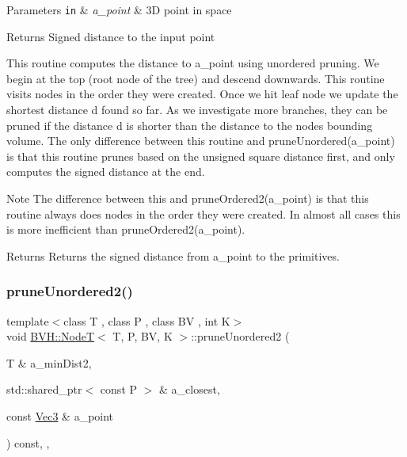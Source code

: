 \begin{DoxyParams}[1]{Parameters}
\mbox{\tt in}  & {\em a\+\_\+point} & 3D point in space \\
\hline
\end{DoxyParams}
\begin{DoxyReturn}{Returns}
Signed distance to the input point
\end{DoxyReturn}
This routine computes the distance to a\+\_\+point using unordered pruning. We begin at the top (root node of the tree) and descend downwards. This routine visits nodes in the order they were created. Once we hit leaf node we update the shortest distance \textquotesingle{}d\textquotesingle{} found so far. As we investigate more branches, they can be pruned if the distance \textquotesingle{}d\textquotesingle{} is shorter than the distance to the node\textquotesingle{}s bounding volume. The only difference between this routine and prune\+Unordered(a\+\_\+point) is that this routine prunes based on the unsigned square distance first, and only computes the signed distance at the end. \begin{DoxyNote}{Note}
The difference between this and prune\+Ordered2(a\+\_\+point) is that this routine always does nodes in the order they were created. In almost all cases this is more inefficient than prune\+Ordered2(a\+\_\+point). 
\end{DoxyNote}
\begin{DoxyReturn}{Returns}
Returns the signed distance from a\+\_\+point to the primitives. 
\end{DoxyReturn}
\mbox{\label{classBVH_1_1NodeT_a1079cba9ac1f114ad2cbc6cdea2eae49}} 
\subsubsection{\texorpdfstring{prune\+Unordered2()}{pruneUnordered2()}\hspace{0.1cm}{\footnotesize\ttfamily [2/2]}}
{\footnotesize\ttfamily template$<$class T , class P , class BV , int K$>$ \\
void \hyperlink{classBVH_1_1NodeT}{B\+V\+H\+::\+NodeT}$<$ T, P, BV, K $>$\+::prune\+Unordered2 (\begin{DoxyParamCaption}\item[{T \&}]{a\+\_\+min\+Dist2,  }\item[{std\+::shared\+\_\+ptr$<$ const P $>$ \&}]{a\+\_\+closest,  }\item[{const \hyperlink{classBVH_1_1NodeT_a6fbb4308c5c55ee170c5f992df7ae1d0}{Vec3} \&}]{a\+\_\+point }\end{DoxyParamCaption}) const\hspace{0.3cm}{\ttfamily [inline]}, {\ttfamily [protected]}, {\ttfamily [noexcept]}}



